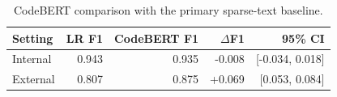 \begin{table}[t]
\centering
\caption{CodeBERT comparison with the primary sparse-text baseline.}
\label{tab:codebert_comparison}
\small
\begin{tabular}{lrrrr}
\toprule
Setting & LR F1 & CodeBERT F1 & $\Delta$F1 & 95\% CI \\
\midrule
Internal & 0.943 & 0.935 & -0.008 & [-0.034, 0.018] \\
External & 0.807 & 0.875 & +0.069 & [0.053, 0.084] \\
\bottomrule
\end{tabular}
\end{table}
